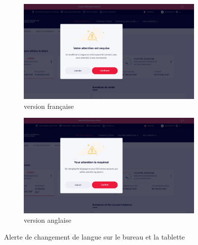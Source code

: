 \begin{figure}[!ht]
    \centering
    \begin{subfigure}[b]{0.49\textwidth}
        \centering
        \includegraphics[width=\textwidth]{images/screens/switch/desktop-fr.png}
        \caption{version française}
    \end{subfigure}
    \hfill
    \begin{subfigure}[b]{0.49\textwidth}
        \centering
        \includegraphics[width=\textwidth]{images/screens/switch/desktop-ang.png}
        \caption{version anglaise}
    \end{subfigure}
       \caption{Alerte de changement de langue sur le bureau et la tablette}
\end{figure}
\newpage


